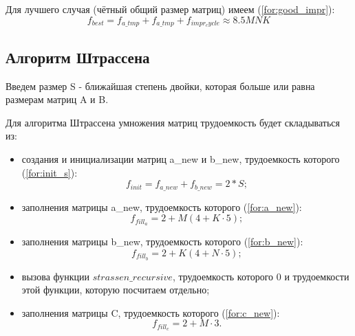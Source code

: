 Для лучшего случая (чётный общий размер матриц) имеем (\ref{for:good_impr}):
\begin{equation}
	\label{for:good_impr}
	f_{best} = f_{a\_tmp} + f_{a\_tmp} + f_{impr_cycle} \approx 8.5MNK
\end{equation}


\subsection{Алгоритм Штрассена}

Введем размер S - ближайшая степень двойки, которая больше или равна размерам матриц A и B.


Для алгоритма Штрассена умножения матриц трудоемкость будет складываться из:

\begin{itemize}
	\item создания и инициализации матриц a\_new и b\_new, трудоемкость которого (\ref{for:init_s}):
	\begin{equation}
		\label{for:init_s}
		f_{init} = f_{a\_new} + f_{b\_new} = 2 * S;
	\end{equation}
	\item заполнения матрицы a\_new, трудоемкость которого (\ref{for:a_new}):
	\begin{equation}
		\label{for:a_new}
		f_{fill_a} = 2 + M (4 + K \cdot 5);
	\end{equation}
	\item заполнения матрицы b\_new, трудоемкость которого (\ref{for:b_new}):
	\begin{equation}
		\label{for:b_new}
		f_{fill_b} = 2 + K (4 + N \cdot 5);
	\end{equation}
	\item вызова функции $strassen\_recursive$, трудоемкость которого 0 и трудоемкости этой функции, которую посчитаем отдельно;
	\item заполнения матрицы C, трудоемкость которого (\ref{for:c_new}):
	\begin{equation}
		\label{for:c_new}
		f_{fill_c} = 2 + M \cdot 3.
	\end{equation}
	\newline
\end{itemize}

